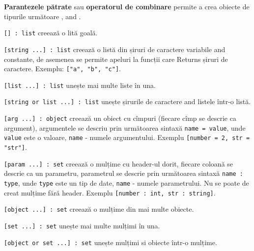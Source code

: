 {\bf Parantezele pătrate} sau {\bf operatorul de combinare} permite a crea obiecte de tipurile următoare \listtype{}, \set{} and \object{}.

\texttt{[] : list} creează o lită goală.

\texttt{[string ...] : list} creează o listă din șiruri de caractere variabile and constante, de asemenea se permite apeluri la funcții care Returns șiruri de caractere. Exemplu: \texttt{["a", "b", "c"]}.

\texttt{[list ...] : list} unește mai multe liste în una.

\texttt{[string or list ...] : list} unește șirurile de caractere and listele într-o listă.

\texttt{[arg ...] : object} creează un obiect cu cîmpuri (fiecare cîmp se descrie ca argument), argumentele se descriu prin următoarea sintaxă \texttt{name = value}, unde \texttt{value} este o valoare, \texttt{name} - numele argumentului. Exemplu \texttt{[number = 2, str = "str"]}.

\texttt{[param ...] : set} creează o mulțime cu header-ul dorit, fiecare coloană se descrie ca un parametru, parametrul se descrie prin următoarea sintaxă \texttt{name : type}, unde \texttt{type} este un tip de date, \texttt{name} - numele parametrului. Nu se poate de creat mulțime fără header. Exemplu \texttt{[number : int, str : string]}.

\texttt{[object ...] : set} creează o mulțime din mai multe obiecte.

\texttt{[set ...] : set} unește mai multe mulțimi în una.

\texttt{[object or set ...] : set} unește mulțimi si obiecte într-o mulțime.

